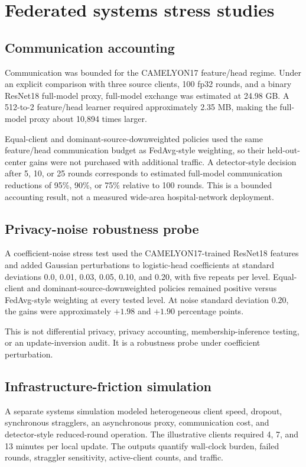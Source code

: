 \section{Federated systems stress studies}

\subsection{Communication accounting}
Communication was bounded for the CAMELYON17 feature/head regime. Under an explicit comparison with three source clients, 100 fp32 rounds, and a binary ResNet18 full-model proxy, full-model exchange was estimated at 24.98 GB. A 512-to-2 feature/head learner required approximately 2.35 MB, making the full-model proxy about 10,894 times larger.

Equal-client and dominant-source-downweighted policies used the same feature/head communication budget as FedAvg-style weighting, so their held-out-center gains were not purchased with additional traffic. A detector-style decision after 5, 10, or 25 rounds corresponds to estimated full-model communication reductions of 95\%, 90\%, or 75\% relative to 100 rounds. This is a bounded accounting result, not a measured wide-area hospital-network deployment.

\subsection{Privacy-noise robustness probe}
A coefficient-noise stress test used the CAMELYON17-trained ResNet18 features and added Gaussian perturbations to logistic-head coefficients at standard deviations 0.0, 0.01, 0.03, 0.05, 0.10, and 0.20, with five repeats per level. Equal-client and dominant-source-downweighted policies remained positive versus FedAvg-style weighting at every tested level. At noise standard deviation 0.20, the gains were approximately $+1.98$ and $+1.90$ percentage points.

This is not differential privacy, privacy accounting, membership-inference testing, or an update-inversion audit. It is a robustness probe under coefficient perturbation.

\subsection{Infrastructure-friction simulation}
A separate systems simulation modeled heterogeneous client speed, dropout, synchronous stragglers, an asynchronous proxy, communication cost, and detector-style reduced-round operation. The illustrative clients required 4, 7, and 13 minutes per local update. The outputs quantify wall-clock burden, failed rounds, straggler sensitivity, active-client counts, and traffic.

